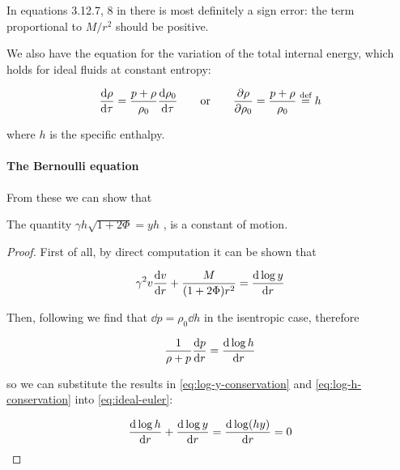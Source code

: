 \documentclass[main.tex]{subfiles}
\begin{document}
\begin{greenbox}
  In equations 3.12.7, 8 in \cite{Nobili:2000} there is most definitely a sign error: the term proportional to \(M/r^2\) should be positive.
\end{greenbox}

We also have the equation for the variation of the total internal energy, which holds for ideal fluids at constant entropy:

\begin{equation} \label{eq:enthalpy-definition}
    \dv{\rho}{\tau} = \frac{p+\rho}{\rho_0} \dv{\rho_0}{\tau}
    \qquad
    \text{or}
    \qquad
    \pdv{\rho}{\rho_0} = \frac{p + \rho}{\rho_0} \defeq h
\end{equation}

where $h$ is the specific enthalpy.

\paragraph{The Bernoulli equation}

From these we can show that

\begin{claim}
  The quantity $\gamma h \sqrt{1+2\Phi} = yh$ , is a constant of motion.
\end{claim}

\begin{proof}
First of all, by direct computation it can be shown that

\begin{equation} \label{eq:log-y-conservation}
  \gamma^2 v \dv{v}{r} + \frac{M}{(1+ 2 \Phi) r^2} = \dv{\log y }{r}
\end{equation}

Then, following \textcite[section 6.3]{Gourgoulhon:2006bn} we find that \(\dd{p} = \rho_0 \dd{h}\) in the isentropic case, therefore

\begin{equation} \label{eq:log-h-conservation}
  \frac{1}{\rho + p} \dv{p}{r}  =  \dv{\log h}{r}
\end{equation}

so we can substitute the results in \eqref{eq:log-y-conservation} and \eqref{eq:log-h-conservation} into \eqref{eq:ideal-euler}:

\begin{equation}
  \dv{\log h}{r} + \dv{\log y }{r} = \dv{\log (hy) }{r} = 0
\end{equation}

\end{proof}
\end{document}

